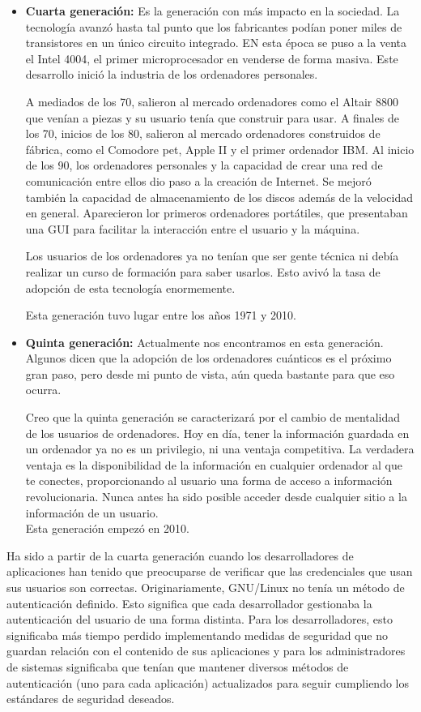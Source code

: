 \documentclass[titlepage, 12pt, a4paper]{article}
\begin{document}
\begin{itemize}
	\item{\textbf{Cuarta generación: }}Es la generación con más impacto en la sociedad. La tecnología avanzó hasta tal punto que los fabricantes podían poner miles de transistores en un único circuito integrado. EN esta época se puso a la venta el Intel 4004, el primer microprocesador en venderse de forma masiva. Este desarrollo inició la industria de los ordenadores personales.\par A mediados de los 70, salieron al mercado ordenadores como el Altair 8800 que venían a piezas y su usuario tenía que construir para usar. A finales de los 70, inicios de los 80, salieron al mercado ordenadores construidos de fábrica, como el Comodore pet, Apple II y el primer ordenador IBM. Al inicio de los 90, los ordenadores personales y la capacidad de crear una red de comunicación entre ellos dio paso a la creación de Internet. Se mejoró también la capacidad de almacenamiento de los discos además de la velocidad en general. Aparecieron lor primeros ordenadores portátiles, que presentaban una \Gls{GUI} para facilitar la interacción entre el usuario y la máquina.\par Los usuarios de los ordenadores ya no tenían que ser gente técnica ni debía realizar un curso de formación para saber usarlos. Esto avivó la tasa de adopción de esta tecnología enormemente.\par Esta generación tuvo lugar entre los años 1971 y 2010.
	\item{\textbf{Quinta generación: }}Actualmente nos encontramos en esta generación. Algunos dicen que la adopción de los ordenadores cuánticos es el próximo gran paso, pero desde mi punto de vista, aún queda bastante para que eso ocurra.\par Creo que la quinta generación se caracterizará por el cambio de mentalidad de los usuarios de ordenadores. Hoy en día, tener la información guardada en un ordenador ya no es un privilegio, ni una ventaja competitiva. La verdadera ventaja es la disponibilidad de la información en cualquier ordenador al que te conectes, proporcionando al usuario una forma de acceso a información revolucionaria. Nunca antes ha sido posible acceder desde cualquier sitio a la información de un usuario.\\Esta generación empezó en 2010.
\end{itemize} \par
Ha sido a partir de la cuarta generación cuando los desarrolladores de aplicaciones han tenido que preocuparse de verificar que las credenciales que usan sus usuarios son correctas. Originariamente, \Gls{GNU/Linux} no tenía un método de autenticación definido. Esto significa que cada desarrollador gestionaba la autenticación del usuario de una forma distinta. Para los desarrolladores, esto significaba más tiempo perdido implementando medidas de seguridad que no guardan relación con el contenido de sus aplicaciones y para los administradores de sistemas significaba que tenían que mantener diversos métodos de autenticación (uno para cada aplicación) actualizados para seguir cumpliendo los estándares de seguridad deseados. \par
\end{document}
